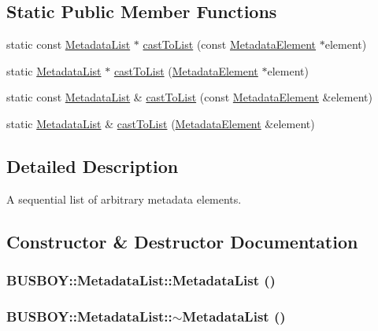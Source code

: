 \subsection*{Static Public Member Functions}
\begin{DoxyCompactItemize}
\item 
static const \hyperlink{classBUSBOY_1_1MetadataList}{MetadataList} $\ast$ \hyperlink{classBUSBOY_1_1MetadataList_a629f4e7790528085ed62bf66e0bd82a3}{castToList} (const \hyperlink{classBUSBOY_1_1MetadataElement}{MetadataElement} $\ast$element)
\item 
static \hyperlink{classBUSBOY_1_1MetadataList}{MetadataList} $\ast$ \hyperlink{classBUSBOY_1_1MetadataList_a071867b51cdd1db3b6f9a60aacfe91b7}{castToList} (\hyperlink{classBUSBOY_1_1MetadataElement}{MetadataElement} $\ast$element)
\item 
static const \hyperlink{classBUSBOY_1_1MetadataList}{MetadataList} \& \hyperlink{classBUSBOY_1_1MetadataList_abee1c415db2ff88c6e8ec03753c75b03}{castToList} (const \hyperlink{classBUSBOY_1_1MetadataElement}{MetadataElement} \&element)
\item 
static \hyperlink{classBUSBOY_1_1MetadataList}{MetadataList} \& \hyperlink{classBUSBOY_1_1MetadataList_a1b3f9d17f8ce5d35351bbe60e5369555}{castToList} (\hyperlink{classBUSBOY_1_1MetadataElement}{MetadataElement} \&element)
\end{DoxyCompactItemize}


\subsection{Detailed Description}
A sequential list of arbitrary metadata elements. 

\subsection{Constructor \& Destructor Documentation}
\hypertarget{classBUSBOY_1_1MetadataList_a1a7f49097e6bfe6e876f88473d424b97}{
\subsubsection[{MetadataList}]{\setlength{\rightskip}{0pt plus 5cm}BUSBOY::MetadataList::MetadataList ()}}
\label{classBUSBOY_1_1MetadataList_a1a7f49097e6bfe6e876f88473d424b97}
\hypertarget{classBUSBOY_1_1MetadataList_a4f78901c10de5fc72a7887bf95293e07}{
\subsubsection[{$\sim$MetadataList}]{\setlength{\rightskip}{0pt plus 5cm}BUSBOY::MetadataList::$\sim$MetadataList ()}}
\label{classBUSBOY_1_1MetadataList_a4f78901c10de5fc72a7887bf95293e07}


